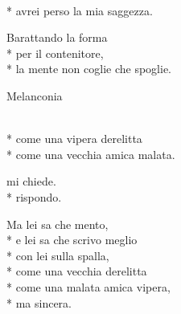\documentclass[12pt]{book}
\begin{document}
\begin{poem}{}{}

\settowidth{\versewidth}{non meno è ciò che meriti.}


\begin{altverse}
\\*
avrei perso la mia saggezza.
\end{altverse}

\begin{altverse}
Barattando la forma \\*
per il contenitore, \\*
la mente non coglie che spoglie.
\end{altverse}


\end{poem}


\begin{poem}{Melanconia}{}

\settowidth{\versewidth}{non meno è ciò che meriti.}

\begin{altverse}
\\*
come una vipera derelitta\\*
come una vecchia amica malata.
\end{altverse}

\begin{altverse}
 mi chiede.\\*
 rispondo.
\end{altverse}

\begin{altverse}
Ma lei sa che mento,\\*
e lei sa che scrivo meglio\\*
con lei sulla spalla,\\*
come una vecchia derelitta\\*
come una malata amica vipera,\\*
ma sincera.
\end{altverse}


\end{poem}
\end{document}
